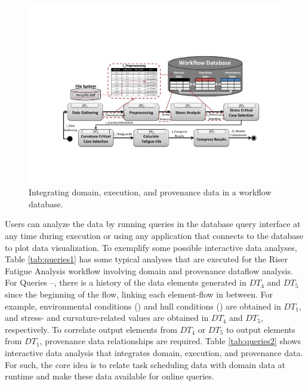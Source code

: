 \begin{figure}[H]
    \centering
    \includegraphics[width=\textwidth,keepaspectratio]{img/workflow-db.pdf}
    \caption{Integrating domain, execution, and provenance data in a workflow database.}
    \label{fig:rfa_workflow_with_prov}
\end{figure}

Users can analyze the data by running queries in the database query interface at any time during execution or using any application that connects to the database to plot data visualization.
To exemplify some possible interactive data analyses, Table \ref{tab:queries1} has some typical analyses that are executed for the Riser Fatigue Analysis workflow involving domain and provenance dataflow analysis. For Queries --, there is a history of the data elements generated in $DT_4$ and $DT_5$ since the beginning of the flow, linking each element-flow in between. For example, environmental conditions () and hull conditions () are obtained in $DT_1$, and stress- and curvature-related values are obtained in $DT_4$ and $DT_5$, respectively. To correlate output elements from $DT_4$ or $DT_5$ to output elements from $DT_1$, provenance data relationships are required. Table \ref{tab:queries2} shows interactive data analysis that integrates domain, execution, and provenance data. For such, the core idea is to relate task scheduling data with domain data at runtime and make these data available for online queries.





